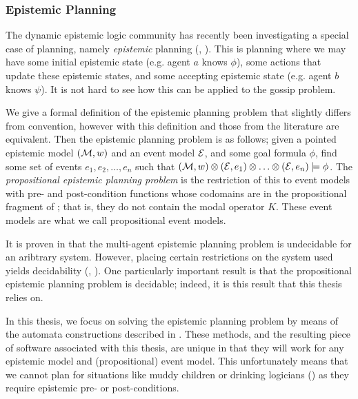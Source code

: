 \documentclass[12pt, a4paper]{article}
\begin{document}
\subsubsection{Epistemic Planning}

The dynamic epistemic logic community has recently been investigating a special case
of planning, namely \textit{epistemic} planning (\cite{BolanderEP},
\cite{UndecidabilityEP}). This is planning where we may have some initial
epistemic state (e.g. agent $a$ knows $\phi$), some actions that update these
epistemic states, and some accepting epistemic state (e.g. agent $b$ knows
$\psi$). It is not hard to see how this can be applied to the gossip problem.

We give a formal definition of the epistemic planning problem that slightly
differs from convention, however with this definition and those from the
literature are equivalent. Then the epistemic planning problem is as follows;
given a pointed epistemic model $(\mathcal{M}, w)$ and an event model $\mathcal{E}$, and
some goal formula $\phi$, find some set of events ${e_1, e_2, \ldots, e_n}$ such
that $(\mathcal{M}, w) \otimes (\mathcal{E}, e_1) \otimes \ldots \otimes (\mathcal{E}, e_n)
\models \phi$. The \textit{propositional epistemic planning problem} is the
restriction of this to event models with pre- and post-condition functions whose
codomains are in the propositional fragment of ; that is, they do not
contain the modal operator $K$. These event models are what we call
propositional event models. 

It is proven in \cite{BolanderEP} that the multi-agent epistemic planning
problem is undecidable for an aribtrary system. However, placing certain
restrictions on the system used yields decidability (\cite{DecidabilityEp},
\cite{AutomataTechniques}). One particularly important result is that the
propositional epistemic planning problem is decidable; indeed, it is this result
that this thesis relies on. 

\bigskip \bigskip \bigskip

In this thesis, we focus on solving the epistemic planning problem by means of
the automata constructions described in \cite{AutomataTechniques}. These
methods, and the resulting piece of software associated with this thesis, are
unique in that they will work for any epistemic model and (propositional) event
model. This unfortunately means that we cannot plan for situations like muddy
children or drinking logicians (\cite{DEMO-S5}) as they require epistemic pre-
or post-conditions. 
\end{document}
